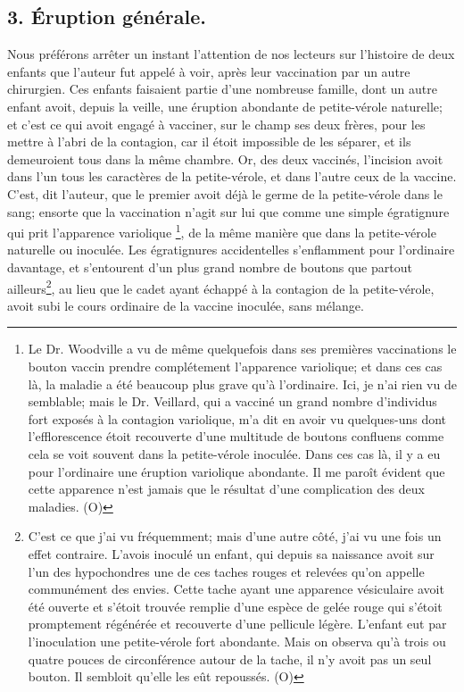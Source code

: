 \subsection{3. Éruption générale.}
Nous préférons arrêter un instant l'attention de nos lecteurs sur l'histoire de deux enfants que l'auteur fut appelé à voir, après leur vaccination par un autre chirurgien. Ces enfants faisaient partie d'une nombreuse famille, dont un autre enfant avoit, depuis la veille, une éruption abondante de petite-vérole naturelle; et c'est ce qui avoit engagé à vacciner, sur le champ ses deux frères, pour les mettre à l'abri de la contagion, car il étoit impossible de les séparer, et ils demeuroient tous dans la même chambre. Or, des deux vaccinés, l'incision avoit dans l'un tous les caractères de la petite-vérole, et dans l'autre ceux de la vaccine. C'est, dit l'auteur, que le premier avoit déjà le germe de la petite-vérole dans le sang; ensorte que la vaccination n'agit sur lui que comme une simple égratignure qui prit l'apparence variolique \footnote{Le Dr. Woodville a vu de même quelquefois dans ses premières vaccinations le bouton vaccin prendre complétement l'apparence variolique; et dans ces cas là, la maladie a été beaucoup plus grave qu'à l'ordinaire. Ici, je n'ai rien vu de semblable; mais le Dr. Veillard, qui a vacciné un grand nombre d'individus fort exposés à la contagion variolique, m'a dit en avoir vu quelques-uns dont l'efflorescence étoit recouverte d'une multitude de boutons confluens comme cela se voit souvent dans la petite-vérole inoculée. Dans ces cas là, il y a eu pour l'ordinaire une éruption variolique abondante. Il me paroît évident que cette apparence n'est jamais que le résultat d'une complication des deux maladies. (O)}, de la même manière que dans la\setcounter{page}{380} petite-vérole naturelle ou inoculée. Les égratignures accidentelles s'enflamment pour l'ordinaire davantage, et s'entourent d'un plus grand nombre de boutons que partout ailleurs\footnote{C'est ce que j'ai vu fréquemment; mais d'une autre côté, j'ai vu une fois un effet contraire. L'avois inoculé un enfant, qui depuis sa naissance avoit sur l'un des hypochondres une de ces taches rouges et relevées qu'on appelle communément des envies. Cette tache ayant une apparence vésiculaire avoit été ouverte et s'étoit trouvée remplie d'une espèce de gelée rouge qui s'étoit promptement régénérée et recouverte d'une pellicule légère. L'enfant eut par l'inoculation une petite-vérole fort abondante. Mais on observa qu'à trois ou quatre pouces de circonférence autour de la tache, il n'y avoit pas un seul bouton. Il sembloit qu'elle les eût repoussés. (O)}, au lieu que le cadet ayant échappé à la contagion de la petite-vérole, avoit subi le cours ordinaire de la vaccine inoculée, sans mélange.\setcounter{page}{381}
